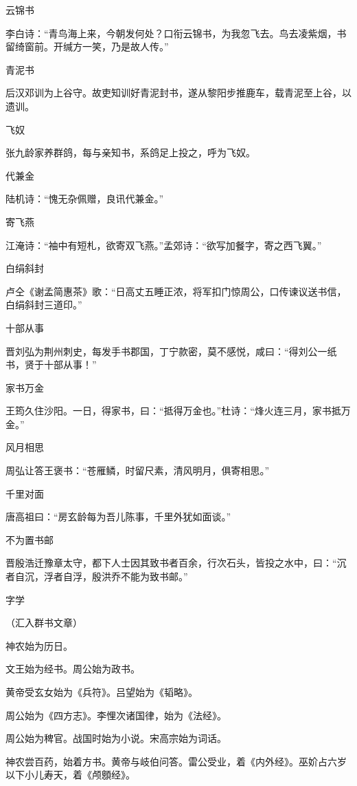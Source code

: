 \documentclass[a4paper,12pt,UTF8,twoside]{ctexbook}
\begin{document}
    云锦书
    
    李白诗：“青鸟海上来，今朝发何处？口衔云锦书，为我忽飞去。鸟去凌紫烟，书留绮窗前。开缄方一笑，乃是故人传。”
    
    青泥书
    
    后汉邓训为上谷守。故吏知训好青泥封书，遂从黎阳步推鹿车，载青泥至上谷，以遗训。
    
    飞奴
    
    张九龄家养群鸽，每与亲知书，系鸽足上投之，呼为飞奴。
    
    代兼金
    
    陆机诗：“愧无杂佩赠，良讯代兼金。”
    
    寄飞燕
    
    江淹诗：“袖中有短札，欲寄双飞燕。”孟郊诗：“欲写加餐字，寄之西飞翼。”
    
    白绢斜封
    
    卢仝《谢孟简惠茶》歌：“日高丈五睡正浓，将军扣门惊周公，口传谏议送书信，白绢斜封三道印。”
    
    十部从事
    
    晋刘弘为荆州刺史，每发手书郡国，丁宁款密，莫不感悦，咸曰：“得刘公一纸书，贤于十部从事！”
    
    家书万金
    
    王筠久住沙阳。一日，得家书，曰：“抵得万金也。”杜诗：“烽火连三月，家书抵万金。”
    
    风月相思
    
    周弘让答王褒书：“苍雁鳞，时留尺素，清风明月，俱寄相思。”
    
    千里对面
    
    唐高祖曰：“房玄龄每为吾儿陈事，千里外犹如面谈。”
    
    不为置书邮
    
    晋殷浩迁豫章太守，都下人士因其致书者百余，行次石头，皆投之水中，曰：“沉者自沉，浮者自浮，殷洪乔不能为致书邮。”
    
    字学
    
    （汇入群书文章）
    
    神农始为历日。
    
    文王始为经书。周公始为政书。
    
    黄帝受玄女始为《兵符》。吕望始为《韬略》。
    
    周公始为《四方志》。李悝次诸国律，始为《法经》。
    
    周公始为稗官。战国时始为小说。宋高宗始为词话。
    
    神农尝百药，始着方书。黄帝与岐伯问答。雷公受业，着《内外经》。巫妎占六岁以下小儿寿天，着《颅顖经》。
    
\end{document}
